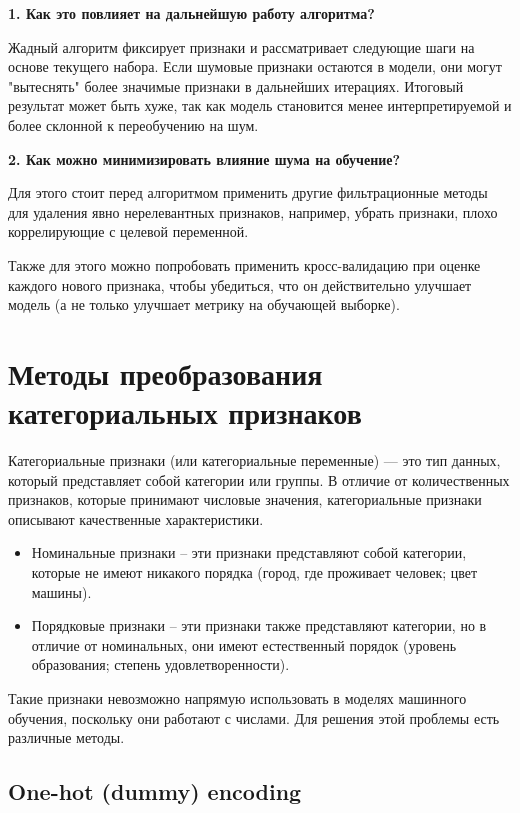 \textbf{1. Как это повлияет на дальнейшую работу алгоритма?}

Жадный алгоритм фиксирует признаки и рассматривает следующие шаги на основе текущего набора. Если шумовые признаки остаются в модели, они могут "вытеснять" более значимые признаки в дальнейших итерациях.
Итоговый результат может быть хуже, так как модель становится менее интерпретируемой и более склонной к переобучению на шум.

\textbf{2. Как можно минимизировать влияние шума на обучение?}

Для этого стоит перед алгоритмом применить другие фильтрационные методы для удаления явно нерелевантных признаков, например, убрать признаки, плохо коррелирующие с целевой переменной.

Также для этого можно попробовать применить кросс-валидацию при оценке каждого нового признака, чтобы убедиться, что он действительно улучшает модель (а не только улучшает метрику на обучающей выборке).

\section{Методы преобразования категориальных признаков}

Категориальные признаки (или категориальные переменные) — это тип данных, который представляет собой категории или группы. В отличие от количественных признаков, которые принимают числовые значения, категориальные признаки описывают качественные характеристики.

\begin{itemize}
    \item Номинальные признаки -- эти признаки представляют собой категории, которые не имеют никакого порядка (город, где проживает человек; цвет машины).
    \item Порядковые признаки -- эти признаки также представляют категории, но в отличие от номинальных, они имеют естественный порядок (уровень образования; степень удовлетворенности).
\end{itemize}

Такие признаки невозможно напрямую использовать в моделях машинного обучения, поскольку они работают с числами. Для решения этой проблемы есть различные методы.

\subsection*{One-hot (dummy) encoding}

